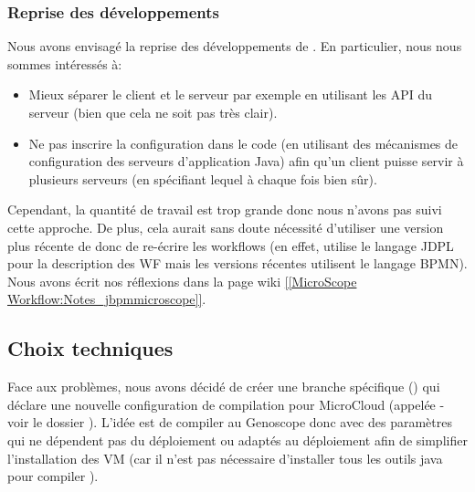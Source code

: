 \subsubsection{Reprise des développements}

Nous avons envisagé la reprise des développements de .
En particulier, nous nous sommes intéressés à:
\begin{itemize}
    \item Mieux séparer le client et le serveur par exemple en utilisant les API du serveur (bien que cela ne soit pas très clair).
    \item Ne pas inscrire la configuration dans le code (en utilisant des mécanismes de configuration des serveurs d'application Java)
          afin qu'un client puisse servir à plusieurs serveurs (en spécifiant lequel à chaque fois bien sûr).
\end{itemize}

Cependant, la quantité de travail est trop grande donc nous n'avons pas suivi cette approche.
De plus, cela aurait sans doute nécessité d'utiliser une version plus récente de 
donc de re-écrire les workflows (en effet,  utilise le langage JDPL pour la description des WF
mais les versions récentes utilisent le langage BPMN).
Nous avons écrit nos réflexions dans la page wiki \href{https://intranet.genoscope.cns.fr/agc/redmine/projects/microscopeworkflow/wiki/Notes_jbpmmicroscope}{[[MicroScope Workflow:Notes\_jbpmmicroscope]]}.

\subsection{Choix techniques}

Face aux problèmes, nous avons décidé de créer une branche spécifique ()
qui déclare une nouvelle configuration de compilation pour MicroCloud (appelée  - voir le dossier ).
L'idée est de compiler  au Genoscope donc avec des paramètres qui ne dépendent pas du déploiement ou adaptés au déploiement
afin de simplifier l'installation des VM (car il n'est pas nécessaire d'installer tous les outils java pour compiler ).

